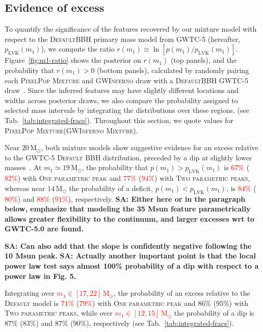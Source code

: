 \documentclass[twocolumn,twocolappendix,linenumbers]{aastex631}
\newcommand{\sa}[1]{{\bf\color{Thistle}SA: #1}}
\newcommand{\PPMixture}{\textsc{PixelPop Mixture}\xspace}
\newcommand{\Gwinferno}{\textsc{GWInferno}\xspace}
\newcommand{\GwinfMixture}{\textsc{GWInferno Mixture}\xspace}
\newcommand{\oneparpeak}{\textsc{One parametric peak}\xspace}
\newcommand{\twoparpeaks}{\textsc{Two parametric peaks}\xspace}
\newcommand{\Default}{\textsc{Default}\xspace}
\newcommand{\Msun}{\ensuremath{\mathrm{M}_\odot}\xspace}
\begin{document}
\subsection{Evidence of excess}\label{subsec:evidence-excess}\nopagebreak[4]
To quantify the significance of the features recovered by our mixture model with respect to the \Default \ac{BBH} primary mass model from \ac{GWTC-5} (hereafter, $p_{\mathrm{LVK}}(m_1)$), we compute the ratio $r(m_1)\equiv\ln[p(m_1)/p_{\mathrm{LVK}}(m_1)]$. 
Figure~\ref{fig:m1-ratio} shows the posterior on $r(m_1)$ (top panels), and the probability that $r(m_1)>0$ (bottom panels), calculated by randomly pairing each \PPMixture and \Gwinferno draw with a \Default \ac{BBH} \ac{GWTC-5} draw~\citep{ligo_scientific_collaboration_2026_20292639}.
Since the inferred features may have slightly different locations and widths across posterior draws, we also compare the probability assigned to selected mass intervals by integrating the distributions over these regions. (see Tab.~\ref{tab:integrated-fracs}). 
Throughout this section, we quote values for \PPMixture (\GwinfMixture).

Near $20\,\Msun$, both mixture models show suggestive evidence for an excess relative to the \ac{GWTC-5} \textsc{Default} \ac{BBH} distribution, preceded by a dip at slightly lower masses~\citep{Legred:2026oiz}.
At $m_1\simeq19\,\Msun$, the probability that $p(m_1)>p_{\mathrm{LVK}}(m_1)$ is \textcolor{red}{$67\%$} (\textcolor{red}{$82\%$}) with \oneparpeak and \textcolor{red}{$77\%$} (\textcolor{red}{$94\%$}) with \twoparpeaks, whereas near $14\,\Msun$ the probability of a deficit, $p(m_1)<p_{\mathrm{LVK}}(m_1)$, is \textcolor{red}{$84\%$} (\textcolor{red}{$80\%$}) and \textcolor{red}{$88\%$} (\textcolor{red}{$91\%$}), respectively. \sa{Either here or in the paragraph below, emphasize that modeling the 35 Msun feature parametrically allows greater flexibility to the continuum, and larger excesses wrt to GWTC-5.0 are found.}

\sa{Can also add that the slope is confidently negative following the 10 Msun peak.}
\sa{Actually another important point is that the local power law test says almost 100\% probability of a dip with respect to a power law in Fig. 5.}

Integrating over \textcolor{red}{$m_1 \in [17,22]\,\Msun$}, the probability of an excess relative to the \textsc{Default} model is \textcolor{red}{$71\%$} (\textcolor{red}{$79\%$}) with \oneparpeak and $86\%$ ($95\%$) with \twoparpeaks, while over \textcolor{red}{$m_1 \in [12,15]\,\Msun$} the probability of a dip is $87\%$ ($83\%$) and $87\%$ ($90\%$), respectively (see Tab.~\ref{tab:integrated-fracs}).
\end{document}
